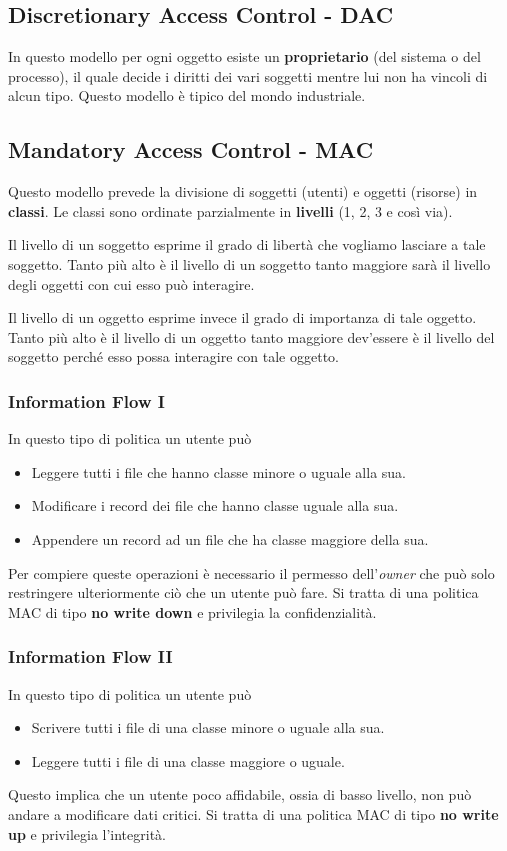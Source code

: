 \subsection{Discretionary Access Control - DAC}
In questo modello per ogni oggetto esiste un \textbf{proprietario} (del sistema o del processo), il quale decide i
diritti dei vari soggetti mentre lui non ha vincoli di alcun tipo. Questo modello è tipico del mondo industriale.

\subsection{Mandatory Access Control - MAC}
Questo modello prevede la divisione di soggetti (utenti) e oggetti (risorse) in \textbf{classi}. Le classi sono
ordinate parzialmente in \textbf{livelli} (1, 2, 3 e così via).

Il livello di un soggetto esprime il grado di libertà che vogliamo lasciare a tale soggetto. Tanto più alto è il
livello di un soggetto tanto maggiore sarà il livello degli oggetti con cui esso può interagire.

Il livello di un oggetto esprime invece il grado di importanza di tale oggetto. Tanto più alto è il livello di un
oggetto tanto maggiore dev'essere è il livello del soggetto perché esso possa interagire con tale oggetto.

\subsubsection{Information Flow I}
In questo tipo di politica un utente può
\begin{itemize}
	\item Leggere tutti i file che hanno classe minore o uguale alla sua.
	\item Modificare i record dei file che hanno classe uguale alla sua.
	\item Appendere un record ad un file che ha classe maggiore della sua.
\end{itemize}
Per compiere queste operazioni è necessario il permesso dell'\emph{owner} che può solo restringere ulteriormente ciò
che un utente può fare. Si tratta di una politica MAC di tipo \textbf{no write down} e privilegia la confidenzialità.

\subsubsection{Information Flow II}
In questo tipo di politica un utente può
\begin{itemize}
	\item Scrivere tutti i file di una classe minore o uguale alla sua.
	\item Leggere tutti i file di una classe maggiore o uguale.
\end{itemize}
Questo implica che un utente poco affidabile, ossia di basso livello, non può andare a modificare dati critici. Si
tratta di una politica MAC di tipo \textbf{no write up} e privilegia l'integrità.

